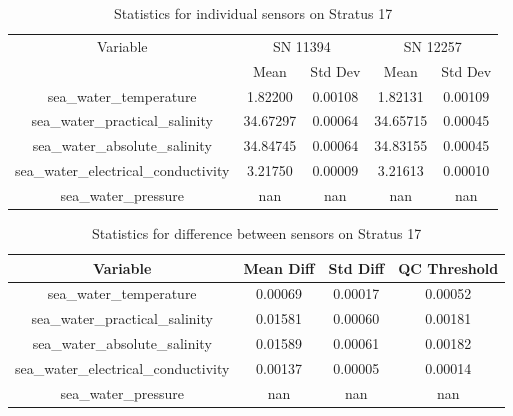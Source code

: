 \begin{table}[h]
\centering
\begin{tabular}{|c|c|c|c|c|}
\hline
Variable & \multicolumn{2}{c|}{SN 11394} & \multicolumn{2}{c|}{SN 12257} \\
& Mean & Std Dev & Mean & Std Dev \\
\hline
sea\_water\_temperature & 1.82200 & 0.00108 & 1.82131 & 0.00109 \\
sea\_water\_practical\_salinity & 34.67297 & 0.00064 & 34.65715 & 0.00045 \\
sea\_water\_absolute\_salinity & 34.84745 & 0.00064 & 34.83155 & 0.00045 \\
sea\_water\_electrical\_conductivity & 3.21750 & 0.00009 & 3.21613 & 0.00010 \\
sea\_water\_pressure & nan & nan & nan & nan \\
\hline
\end{tabular}
\caption{Statistics for individual sensors on Stratus 17}
\end{table}

\begin{table}[h]
\centering
\begin{tabular}{|c|c|c|c|}
\hline
Variable & Mean Diff & Std Diff & QC Threshold \\
\hline
sea\_water\_temperature & 0.00069 & 0.00017 & 0.00052 \\
sea\_water\_practical\_salinity & 0.01581 & 0.00060 & 0.00181 \\
sea\_water\_absolute\_salinity & 0.01589 & 0.00061 & 0.00182 \\
sea\_water\_electrical\_conductivity & 0.00137 & 0.00005 & 0.00014 \\
sea\_water\_pressure & nan & nan & nan \\
\hline
\end{tabular}
\caption{Statistics for difference between sensors on Stratus 17}
\end{table}

